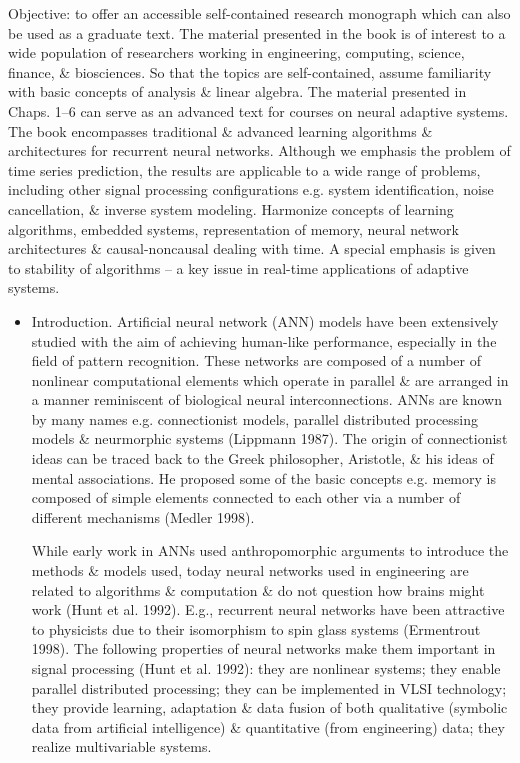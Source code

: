 \documentclass{article}
\begin{document}
\begin{enumerate}
	Objective: to offer an accessible self-contained research monograph which can also be used as a graduate text. The material presented in the book is of interest to a wide population of researchers working in engineering, computing, science, finance, \& biosciences. So that the topics are self-contained, assume familiarity with basic concepts of analysis \& linear algebra. The material presented in Chaps. 1--6 can serve as an advanced text for courses on neural adaptive systems. The book encompasses traditional \& advanced learning algorithms \& architectures for recurrent neural networks. Although we emphasis the problem of time series prediction, the results are applicable to a wide range of problems, including other signal processing configurations e.g. system identification, noise cancellation, \& inverse system modeling. Harmonize concepts of learning algorithms, embedded systems, representation of memory, neural network architectures \& causal-noncausal dealing with time. A special emphasis is given to stability of algorithms -- a key issue in real-time applications of adaptive systems.
	\begin{itemize}
		\item {\sf Introduction.} Artificial neural network (ANN) models have been extensively studied with the aim of achieving human-like performance, especially in the field of pattern recognition. These networks are composed of a number of nonlinear computational elements which operate in parallel \& are arranged in a manner reminiscent of biological neural interconnections. ANNs are known by many names e.g. connectionist models, parallel distributed processing models \& neurmorphic systems (Lippmann 1987). The origin of connectionist ideas can be traced back to the Greek philosopher, {\sc Aristotle}, \& his ideas of mental associations. He proposed some of the basic concepts e.g. memory is composed of simple elements connected to each other via a number of different mechanisms (Medler 1998).
		
		While early work in ANNs used anthropomorphic arguments to introduce the methods \& models used, today neural networks used in engineering are related to algorithms \& computation \& do not question how brains might work (Hunt et al. 1992). E.g., recurrent neural networks have been attractive to physicists due to their isomorphism to spin glass systems (Ermentrout 1998). The following properties of neural networks make them important in signal processing (Hunt et al. 1992): they are nonlinear systems; they enable parallel distributed processing; they can be implemented in VLSI technology; they provide learning, adaptation \& data fusion of both qualitative (symbolic data from artificial intelligence) \& quantitative (from engineering) data; they realize multivariable systems.
		

\end{itemize}
\end{enumerate}
\end{document}
